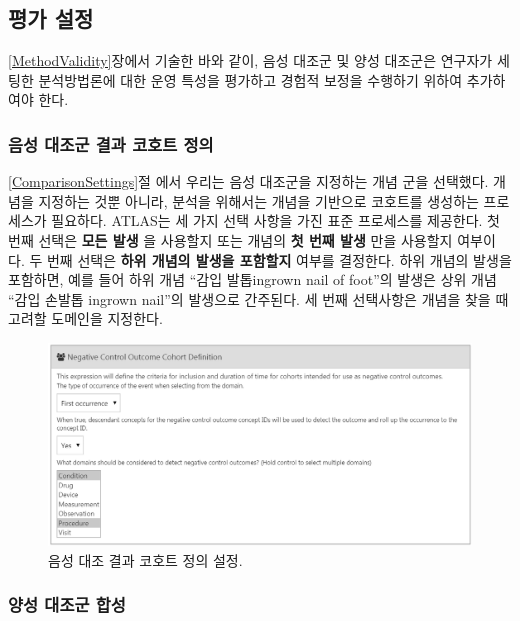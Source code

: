 \documentclass[11pt]{book}
\theoremstyle{definition}
\theoremstyle{definition}
\theoremstyle{definition}
\theoremstyle{remark}
\begin{document}
\subsection{평가 설정}\label{evaluationSettings}

\ref{MethodValidity}장에서 기술한 바와 같이, 음성 대조군 및 양성
대조군은 연구자가 세팅한 분석방법론에 대한 운영 특성을 평가하고 경험적
보정을 수행하기 위하여 추가하여야 한다.

\subsubsection*{음성 대조군 결과 코호트 정의}\label{----}

\ref{ComparisonSettings}절 에서 우리는 음성 대조군을 지정하는 개념 군을
선택했다. 개념을 지정하는 것뿐 아니라, 분석을 위해서는 개념을 기반으로
코호트를 생성하는 프로세스가 필요하다. ATLAS는 세 가지 선택 사항을 가진
표준 프로세스를 제공한다. 첫 번째 선택은 \textbf{모든 발생} 을 사용할지
또는 개념의 \textbf{첫 번째 발생} 만을 사용할지 여부이다. 두 번째 선택은
\textbf{하위 개념의 발생을 포함할지} 여부를 결정한다. 하위 개념의 발생을
포함하면, 예를 들어 하위 개념 ``감입 발톱ingrown nail of foot''의 발생은
상위 개념 ``감입 손발톱 ingrown nail''의 발생으로 간주된다. 세 번째
선택사항은 개념을 찾을 때 고려할 도메인을 지정한다.

\begin{figure}

{\centering \includegraphics[width=1\linewidth]{images/PopulationLevelEstimation/ncSettings} 

}

\caption{음성 대조 결과 코호트 정의 설정.}\label{fig:ncSettings}
\end{figure}

\subsubsection*{양성 대조군 합성}\label{--}
\end{document}

